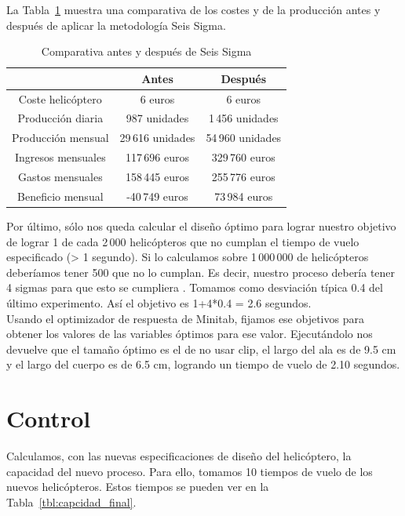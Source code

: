 \documentclass[12pt,a4paper,twoside,openright,titlepage,final]{article}
\begin{document}
La Tabla~\ref{tbl:comparativa} muestra una comparativa de los costes y de la producción antes y después de aplicar la metodología Seis Sigma.\\

\begin{table}[htbp!]
	\centering
	\caption{Comparativa antes y después de Seis Sigma}
	\label{tbl:comparativa}
	\begin{tabular}{@{}ccc@{}}
		\cmidrule(l){2-3}
		& Antes             & Después          \\ \midrule
		Coste helicóptero  & 6 euros           & 6 euros          \\
		Producción diaria  & 987 unidades      & 1\,456 unidades  \\
		Producción mensual & 29\,616  unidades & 54\,960 unidades \\
		Ingresos mensuales & 117\,696 euros    & 329\,760 euros   \\
		Gastos mensuales   & 158\,445 euros    & 255\,776 euros   \\
		Beneficio mensual  & -40\,749 euros    & 73\,984 euros    \\ \bottomrule
	\end{tabular}
\end{table}

Por último, sólo nos queda calcular el diseño óptimo para lograr nuestro objetivo de lograr 1 de cada 2\,000 helicópteros que no cumplan el tiempo de vuelo especificado (> 1 segundo). Si lo calculamos sobre 1\,000\,000 de helicópteros deberíamos tener 500 que no lo cumplan. Es decir, nuestro proceso debería tener 4 sigmas para que esto se cumpliera \cite{Sigma}. Tomamos como desviación típica 0.4 del último experimento. Así el objetivo es 1+4*0.4 = 2.6 segundos.\\

Usando el optimizador de respuesta de Minitab, fijamos ese objetivos para obtener los valores de las variables óptimos para ese valor. Ejecutándolo nos devuelve que el tamaño óptimo es el de no usar clip, el largo del ala es de 9.5 cm y el largo del cuerpo es de 6.5 cm, logrando un tiempo de vuelo de 2.10 segundos. 
 

\section{Control}

Calculamos, con las nuevas especificaciones de diseño del helicóptero, la capacidad del nuevo proceso. Para ello, tomamos 10 tiempos de vuelo de los nuevos helicópteros. Estos tiempos se pueden ver en la Tabla~\ref{tbl:capcidad_final}.\\
\end{document}
